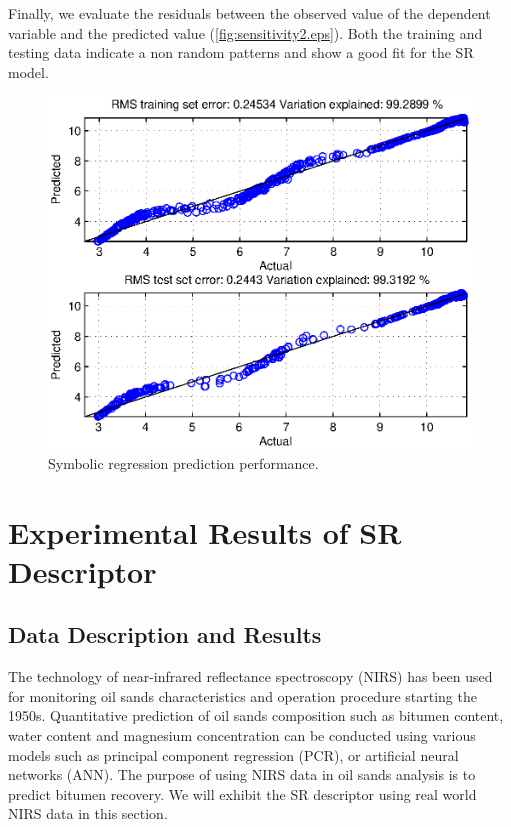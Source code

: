 \documentclass[final,5p,times,twocolumn]{elsarticle}
\begin{document}
Finally, we evaluate the residuals between the observed value of the dependent variable and the predicted value (\autoref{fig:sensitivity2.eps}). Both the training and testing data indicate a non random patterns and show a good fit for the SR model.





\begin{figure}[!hptb]
	\centering
	\includegraphics[width=\linewidth,clip]{sensitivity2.eps}
	\vspace{-2em}
	\caption{Symbolic regression prediction performance.}
	\label{fig:sensitivity2.eps}
\end{figure}





\section{Experimental Results of SR Descriptor} %
\label{sec:improvement}

\subsection{Data Description and Results}
The technology of near-infrared reflectance spectroscopy (NIRS) has been used for monitoring oil sands characteristics and operation procedure starting the 1950s.
Quantitative prediction of oil sands composition such as bitumen content, water content and magnesium concentration can be conducted using various models such as principal component regression (PCR), or artificial neural networks (ANN). The purpose of using NIRS data in oil sands analysis is to predict bitumen recovery. We will exhibit the SR descriptor using real world NIRS data in this section.
\end{document}
